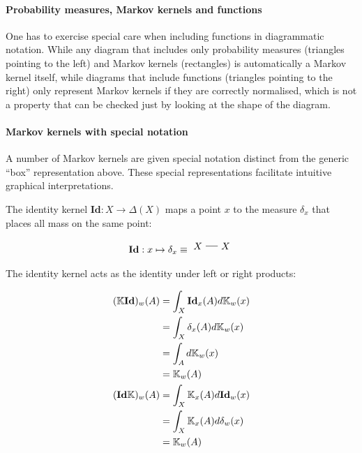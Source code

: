 \paragraph{Probability measures, Markov kernels and functions}

One has to exercise special care when including functions in diagrammatic notation. While any diagram that includes only probability measures (triangles pointing to the left) and Markov kernels (rectangles) is automatically a Markov kernel itself, while diagrams that include functions (triangles pointing to the right) only represent Markov kernels if they are correctly normalised, which is not a property that can be checked just by looking at the shape of the diagram.

\paragraph{Markov kernels with special notation}

A number of Markov kernels are given special notation distinct from the generic ``box'' representation above. These special representations facilitate intuitive graphical interpretations.

The identity kernel $\textbf{Id}:X\to \Delta(X)$ maps a point $x$ to the measure $\delta_x$ that places all mass on the same point:

\begin{align}
\textbf{Id} : x\mapsto \delta_x \equiv \begin{tikzpicture}\path (0,0) node (X) {$X$} + (1,0) node (X1) {$X$}; \draw (X)--(X1); \end{tikzpicture}\label{eq:identity}
\end{align}

The identity kernel acts as the identity under left or right products:

\begin{align}
	(\mathbb{K}\textbf{Id})_w(A) &= \int_X \textbf{Id}_x(A) d\mathbb{K}_w (x) \\
							 	 &= \int_X \delta_x(A) d\mathbb{K}_w(x)\\
							 	 &= \int_A d\mathbb{K}_w(x)\\
							 	 &= \mathbb{K}_w(A)\\
	(\textbf{Id}\mathbb{K})_w(A) &= \int_X \mathbb{K}_x (A) d\textbf{Id}_w(x)\\
								 &= \int_X  \mathbb{K}_x(A) d\delta_w(x)\\
								 &= \mathbb{K}_w(A)								  
\end{align}

